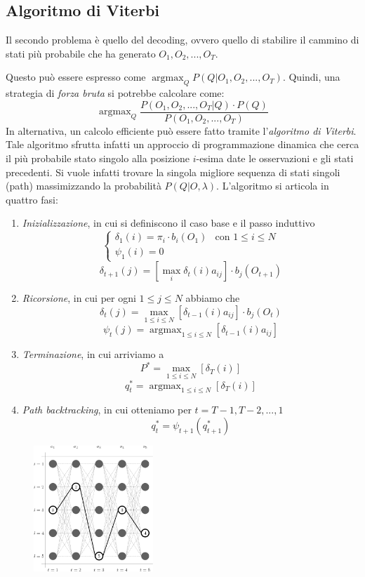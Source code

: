 \documentclass[a4paper,oneside,titlepage]{book}
\DeclareMathOperator*{\argmax}{\arg\max}
\begin{document}
\subsection{Algoritmo di Viterbi}
\label{Viterbi}
Il secondo problema è quello del decoding, ovvero quello di stabilire il cammino di stati più probabile che ha generato $O_1,O_2,...,O_T$.

Questo può essere espresso come $\argmax_Q P(Q|O_1,O_2,...,O_T)$. Quindi, una strategia di \textit{forza bruta} si potrebbe calcolare come:
\[ \argmax_Q \frac{P(O_1,O_2,...,O_T|Q) \cdot P(Q)}{P(O_1,O_2,...,O_T)} \]
In alternativa, un calcolo efficiente può essere fatto tramite l'\textit{algoritmo di Viterbi}. Tale algoritmo sfrutta infatti un approccio di programmazione dinamica che cerca il più probabile stato singolo alla posizione $i$-esima date le osservazioni e gli stati precedenti. Si vuole infatti trovare la singola migliore sequenza di stati singoli (path)
massimizzando la probabilità $P(Q|O,\lambda)$. L'algoritmo si articola in quattro fasi:
\begin{enumerate}
    \item \textit{Inizializzazione}, in cui si definiscono il caso base e il passo induttivo
    \[ \begin{cases}
    	\delta_1(i) = \pi_i \cdot b_i(O_1) & \text{con } 1 \leq i \leq N \\
    	\psi_1(i) = 0 &
    	\end{cases} \]
    \[ \delta_{t+1}(j) = [\max_i \delta_t(i) a_{ij}] \cdot b_j(O_{t+1}) \]
    
    \item \textit{Ricorsione}, in cui per ogni $1 \leq j \leq N$ abbiamo che
    \[ \delta_t(j) = \max_{1 \leq i \leq N} [\delta_{t-1}(i) a_{ij}] \cdot b_j(O_t) \]
    \[ \psi_t(j) = \argmax_{1 \leq i \leq N} [\delta_{t-1}(i) a_{ij}] \]
    
    \item \textit{Terminazione}, in cui arriviamo a
    \[ P^* = \max_{1 \leq i \leq N} [\delta_T(i)] \]
    \[ q_t^* = \argmax_{1 \leq i \leq N} [\delta_T(i)] \]
    
    \item \textit{Path backtracking}, in cui otteniamo per $t= T-1, T-2, ..., 1$
    \[ q_t^* = \psi_{t+1}(q_{t+1}^*) \]
\end{enumerate}
\begin{figure}[htp]
	\centering
	\includegraphics[width=0.4\textwidth]{hmm4.png}
\end{figure}
\end{document}
